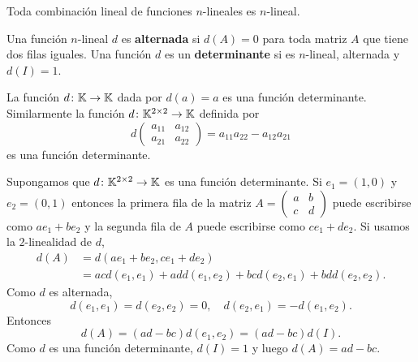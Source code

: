 \begin{xca}
    \label{xca:combinacion_nlineal}
	Toda combinación lineal de funciones $n$-lineales es $n$-lineal.
\end{xca}

\begin{block}
    Una función $n$-lineal $d$ es \textbf{alternada} si $d(A)=0$ para toda
    matriz $A$ que tiene dos filas iguales. Una función $d$ es un
    \textbf{determinante} si es $n$-lineal, alternada y $d(I)=1$.
\end{block}

\begin{examples}
    \label{xca:2x2}
    La función $d\colon\mathbb{K}\to\mathbb{K}$ dada por $d(a)=a$ es una función determinante.
    Similarmente la función $d\colon\mathbb{K}^{2\times2}\to\mathbb{K}$ definida por 
    \[
        d\begin{pmatrix}
            a_{11} & a_{12}\\
            a_{21} & a_{22}
        \end{pmatrix}
        =a_{11}a_{22}-a_{12}a_{21}
    \]
    es una función determinante.
\end{examples}

\begin{example}
    Supongamos que $d\colon\mathbb{K}^{2\times2}\to\mathbb{K}$ es una función determinante. Si
    $e_1=(1,0)$ y $e_2=(0,1)$ entonces la primera fila de la matriz
    $A=\begin{pmatrix}a&b\\c&d\end{pmatrix}$ puede escribirse como $ae_1+be_2$
        y la segunda fila de $A$ puede escribirse como $ce_1+de_2$. Si
        usamos la $2$-linealidad de $d$, 
    \begin{align*}
        d(A)&=d(ae_1+be_2,ce_1+de_2)\\
        &=acd(e_1,e_1)+add(e_1,e_2)+bcd(e_2,e_1)+bdd(e_2,e_2).
    \end{align*}
    Como $d$ es alternada, 
    \[
        d(e_1,e_1)=d(e_2,e_2)=0,\quad
        d(e_2,e_1)=-d(e_1,e_2).
    \]
    Entonces 
    \[
        d(A)=(ad-bc)d(e_1,e_2)=(ad-bc)d(I).
    \]
    Como $d$ es una función determinante, $d(I)=1$ y luego $d(A)=ad-bc$. 
\end{example}

